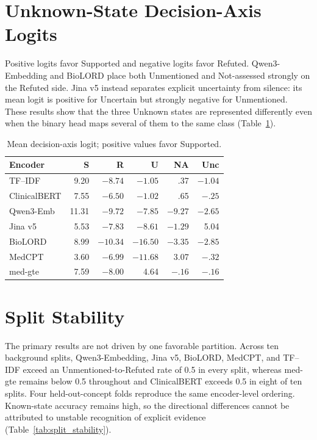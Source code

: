 \documentclass[11pt]{article}
\begin{document}
\FloatBarrier

\section{Unknown-State Decision-Axis Logits}
\label{app:unknown_logit}

Positive logits favor Supported and negative logits favor Refuted. Qwen3-Embedding
and BioLORD place both Unmentioned and Not-assessed strongly on the Refuted side.
Jina v5 instead separates explicit uncertainty from silence: its mean logit is
positive for Uncertain but strongly negative for Unmentioned. These results show
that the three Unknown states are represented differently even when the binary
head maps several of them to the same class (Table~\ref{tab:unknown_logit}).

\begin{table}[!htbp]
  \centering
  \scriptsize
  \renewcommand{\arraystretch}{1.06}
  \caption{Mean decision-axis logit; positive values favor Supported.}
  \label{tab:unknown_logit}
  \begin{tabular*}{\columnwidth}{@{\extracolsep{\fill}}lrrrrr@{}}
    \toprule
    \textbf{Encoder} & \textbf{S} & \textbf{R} &
    \textbf{U} & \textbf{NA} & \textbf{Unc} \\
    \midrule
    TF--IDF      & 9.20 & $-8.74$ & $-1.05$ & .37 & $-1.04$ \\
    ClinicalBERT & 7.55 & $-6.50$ & $-1.02$ & .65 & $-.25$ \\
    Qwen3-Emb    & 11.31 & $-9.72$ & $-7.85$ & $-9.27$ & $-2.65$ \\
    Jina v5      & 5.53 & $-7.83$ & $-8.61$ & $-1.29$ & 5.04 \\
    BioLORD      & 8.99 & $-10.34$ & $-16.50$ & $-3.35$ & $-2.85$ \\
    MedCPT       & 3.60 & $-6.99$ & $-11.68$ & 3.07 & $-.32$ \\
    med-gte      & 7.59 & $-8.00$ & 4.64 & $-.16$ & $-.16$ \\
    \bottomrule
  \end{tabular*}
\end{table}

\FloatBarrier

\section{Split Stability}
\label{app:split_stability}

The primary results are not driven by one favorable partition. Across ten
background splits, Qwen3-Embedding, Jina v5, BioLORD, MedCPT, and TF--IDF exceed an
Unmentioned-to-Refuted rate of 0.5 in every split, whereas med-gte remains below
0.5 throughout and ClinicalBERT exceeds 0.5 in eight of ten splits. Four held-out-concept folds reproduce the same encoder-level
ordering. Known-state accuracy remains high, so the directional differences
cannot be attributed to unstable recognition of explicit evidence
(Table~\ref{tab:split_stability}).
\end{document}
